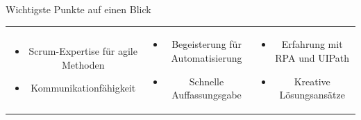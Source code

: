 \documentclass{resume} %
\begin{document}


    


\begin{rSection}
    {Wichtigste Punkte auf einen Blick}

    \begin{tabular}{ccc}
        \begin{minipage}{0.3\textwidth}
        \begin{itemize}
        \item \raggedright{Scrum-Expertise für agile Methoden}
        \item Kommunikationfähigkeit
        \end{itemize}
        \end{minipage} &
        \begin{minipage}{0.3\textwidth}
        \begin{itemize}
        \item Begeisterung für Automatisierung
        \item Schnelle Auffassungsgabe
        \end{itemize}
        \end{minipage} &
        \begin{minipage}{0.3\textwidth}
        \begin{itemize}
        \item \raggedright{Erfahrung mit RPA und UIPath}
        \item Kreative Lösungsansätze
        \end{itemize}
        \end{minipage}
        \end{tabular}

\end{rSection}
\end{document}
